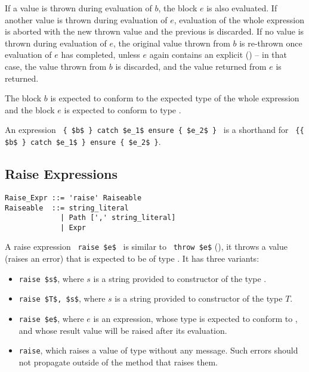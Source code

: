 If a value is thrown during evaluation of $b$, the  block $e$ is also evaluated. If another value is thrown during evaluation of $e$, evaluation of the whole expression is aborted with the new thrown value and the previous is discarded. If no value is thrown during evaluation of $e$, the original value thrown from $b$ is re-thrown once evaluation of $e$ has completed, unless $e$ again contains an explicit  () -- in that case, the value thrown from $b$ is discarded, and the value returned from $e$ is returned. 


The block $b$ is expected to conform to the expected type of the whole expression and the  block $e$ is expected to conform to type . 

An expression ~\lstinline!{ $b$ } catch $e_1$ ensure { $e_2$ }!~ is a shorthand for ~\lstinline!{{ $b$ } catch $e_1$ } ensure { $e_2$ }!. 





\subsection{Raise Expressions}

\syntax\begin{lstlisting}
Raise_Expr ::= 'raise' Raiseable
Raiseable  ::= string_literal
             | Path [',' string_literal]
             | Expr
\end{lstlisting}

A raise expression ~\lstinline!raise $e$!~ is similar to ~\lstinline!throw $e$! (), it throws a value (raises an error) that is expected to be of type . It has three variants: 
\begin{itemize}
\item[] \lstinline!raise $s$!, where $s$ is a string provided to constructor of the type . 
\item[] \lstinline!raise $T$, $s$!, where $s$ is a string provided to constructor of the type $T$. 
\item[] \lstinline!raise $e$!, where $e$ is an expression, whose type is expected to conform to , and whose result value will be raised after its evaluation. 
\item[] \lstinline!raise!, which raises a value of type  without any message. Such errors should not propagate outside of the method that raises them. 
\end{itemize}

